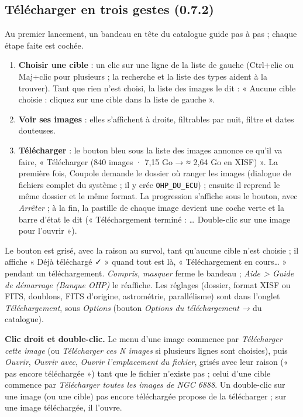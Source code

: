\subsection{Télécharger en trois gestes (0.7.2)}\label{sec:trois-gestes}
Au premier lancement, un bandeau en tête du catalogue guide pas à pas ; chaque étape faite est cochée.
\begin{enumerate}[leftmargin=*,itemsep=1pt]
\item \textbf{Choisir une cible} : un clic sur une ligne de la liste de gauche (Ctrl+clic ou Maj+clic pour
  plusieurs ; la recherche et la liste des types aident à la trouver). Tant que rien n'est choisi, la liste des
  images le dit : « Aucune cible choisie : cliquez sur une cible dans la liste de gauche ».
\item \textbf{Voir ses images} : elles s'affichent à droite, filtrables par nuit, filtre et dates douteuses.
\item \textbf{Télécharger} : le bouton bleu sous la liste des images annonce ce qu'il va faire,
  « Télécharger (840 images · 7,15 Go → ≈ 2,64 Go en XISF) ». La première fois, Coupole demande le dossier où
  ranger les images (dialogue de fichiers complet du système ; il y crée \texttt{OHP\_DU\_ECU}) ; ensuite il
  reprend le même dossier et le même format. La progression s'affiche sous le bouton, avec \emph{Arrêter} ; à la
  fin, la pastille de chaque image devient une coche verte et la barre d'état le dit (« Téléchargement terminé :
  … Double-clic sur une image pour l'ouvrir »).
\end{enumerate}
Le bouton est grisé, avec la raison au survol, tant qu'aucune cible n'est choisie ; il affiche « Déjà téléchargé ✓ »
quand tout est là, « Téléchargement en cours… » pendant un téléchargement. \emph{Compris, masquer} ferme le
bandeau ; \emph{Aide > Guide de démarrage (Banque OHP)} le réaffiche. Les réglages (dossier, format XISF ou FITS,
doublons, FITS d'origine, astrométrie, parallélisme) sont dans l'onglet \emph{Téléchargement}, sous
\emph{Options} (bouton \emph{Options du téléchargement →} du catalogue).

\textbf{Clic droit et double-clic.} Le menu d'une image commence par \emph{Télécharger cette image} (ou
\emph{Télécharger ces N images} si plusieurs lignes sont choisies), puis \emph{Ouvrir}, \emph{Ouvrir avec},
\emph{Ouvrir l'emplacement du fichier}, grisés avec leur raison (« pas encore téléchargée ») tant que le fichier
n'existe pas ; celui d'une cible commence par \emph{Télécharger toutes les images de NGC 6888}. Un double-clic sur
une image (ou une cible) pas encore téléchargée propose de la télécharger ; sur une image téléchargée, il l'ouvre.

